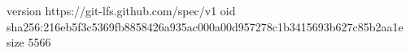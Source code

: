 version https://git-lfs.github.com/spec/v1
oid sha256:216eb5f3c5369fb8858426a935ac000a00d957278c1b3415693b627c85b2aa1e
size 5566
